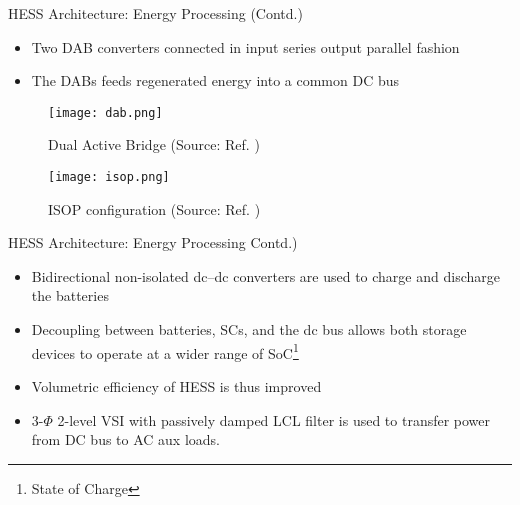 \documentclass[aspectratio=169]{beamer}
\begin{document}
\begin{frame}{HESS Architecture: Energy Processing (Contd.)}
	
	\begin{itemize}
		
		\item Two DAB converters connected in input series output parallel fashion
		\item The DABs feeds regenerated energy into a common DC bus
		
		
		
		
	\end{itemize} 
	\begin{minipage}{0.5\textwidth}
		\begin{center}
	
	\begin{figure}
	\texttt{[image: dab.png]}
	\begin{center}
		\caption{Dual Active Bridge (Source: Ref. \cite{p5})}
	\end{center}
	\label{fig:dab}
	
\end{figure}
\end{center}
\end{minipage}
\begin{minipage}{0.4\textwidth}
	
	
	\begin{figure}
		\texttt{[image: isop.png]}
		\begin{center}
			\caption{ISOP configuration (Source: Ref. \cite{p5})}
		\end{center}
		\label{fig:isop}
		
	\end{figure}
	
\end{minipage}
\end{frame}

\begin{frame}{HESS Architecture: Energy Processing Contd.)}
	
	\begin{itemize}
		
		\item Bidirectional non-isolated dc–dc converters are used to charge and discharge the batteries
		\item Decoupling between batteries, SCs, and the dc bus allows
		both storage devices to operate at a wider range of SoC\footnote{State of Charge}
		\item Volumetric efficiency of HESS is thus improved
		\item 3-$\Phi$ 2-level VSI with passively damped LCL filter is used to transfer power from DC bus to AC aux loads.
	\end{itemize} 
	

	
\end{frame}
\end{document}
